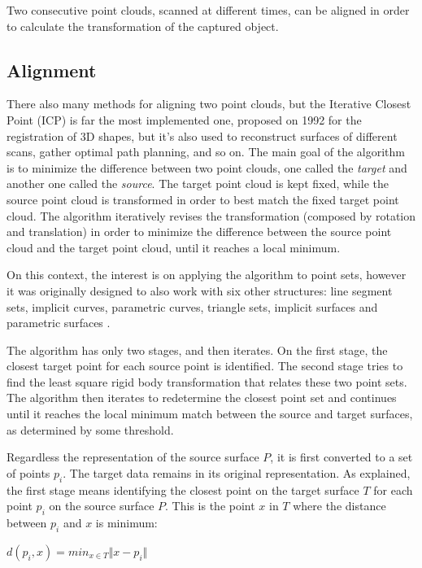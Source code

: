 \documentclass[msc, a4paper, classic, en]{ufbathesis}
\begin{document}
Two consecutive point clouds, scanned at different times, can be aligned in order to calculate the transformation of the captured object.

\subsection{Alignment}

There also many methods for aligning two point clouds, but the Iterative Closest Point (ICP) \cite{icp} is far the most implemented one, proposed on 1992 for the registration of 3D shapes, but it's also used to reconstruct surfaces of different scans, gather optimal path planning, and so on. The main goal of the algorithm is to minimize the difference between two point clouds, one called the \textit{target} and another one called the \textit{source}. The target point cloud is kept fixed, while the source point cloud is transformed in order to best match the fixed target point cloud. The algorithm iteratively revises the transformation (composed by rotation and translation) in order to minimize the difference between the source point cloud and the target point cloud, until it reaches a local minimum.

On this context, the interest is on applying the algorithm to point sets, however it was originally designed to also work with six other structures: line segment sets, implicit curves, parametric curves, triangle sets, implicit surfaces and parametric surfaces \cite{hajnal2014medical}.

The algorithm has only two stages, and then iterates. On the first stage, the closest target point for each source point is identified. The second stage tries to find the least square rigid body transformation that relates these two point sets. The algorithm then iterates to redetermine the closest point set and continues until it reaches the local minimum match between the source and target surfaces, as determined by some threshold.

Regardless the representation of the source surface $P$, it is first converted to a set of points ${p_i}$. The target data remains in its original representation. As explained, the first stage means identifying the closest point on the target surface $T$ for each point $p_i$ on the source surface $P$. This is the point $x$ in $T$ where the distance between $p_i$ and $x$ is minimum:

\begin{center}
  $d(p_i, x) = min_{x \in T} \Vert x - p_i \Vert$
\end{center}
\end{document}
